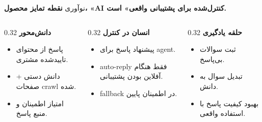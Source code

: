 \documentclass[aspectratio=169,12pt]{beamer}
\begin{document}
\begin{frame}{نوآوری}
  \textbf{نقطه تمایز محصول، «AI کنترل‌شده برای پشتیبانی واقعی» است.}

  \vspace{4mm}
  \begin{columns}[T,totalwidth=\textwidth]
    \begin{column}{0.32\textwidth}
      \textbf{\color{accent}دانش‌محور}
      \begin{itemize}
        \item پاسخ از محتوای تاییدشده مشتری.
        \item دانش دستی + صفحات crawl شده.
        \item امتیاز اطمینان و منبع پاسخ.
      \end{itemize}
    \end{column}
    \begin{column}{0.32\textwidth}
      \textbf{\color{accent}انسان در کنترل}
      \begin{itemize}
        \item پیشنهاد پاسخ برای agent.
        \item auto-reply فقط هنگام آفلاین بودن پشتیبانی.
        \item fallback در اطمینان پایین.
      \end{itemize}
    \end{column}
    \begin{column}{0.32\textwidth}
      \textbf{\color{accent}حلقه یادگیری}
      \begin{itemize}
        \item ثبت سوالات بی‌پاسخ.
        \item تبدیل سوال به دانش.
        \item بهبود کیفیت پاسخ با استفاده واقعی.
      \end{itemize}
    \end{column}
  \end{columns}
\end{frame}
\end{document}

